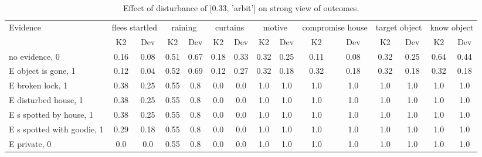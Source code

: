 \begin{table}\begin{tabular}{l|cc|cc|cc|cc|cc|cc|cc}\toprule\multirow{2}{*}{Evidence} & \multicolumn{2}{c}{flees startled}& \multicolumn{2}{c}{raining}& \multicolumn{2}{c}{curtains}& \multicolumn{2}{c}{motive}& \multicolumn{2}{c}{compromise house}& \multicolumn{2}{c}{target object}& \multicolumn{2}{c}{know object}\\& {K2} & {Dev}& {K2} & {Dev}& {K2} & {Dev}& {K2} & {Dev}& {K2} & {Dev}& {K2} & {Dev}& {K2} & {Dev}\\\midrule
no evidence, 0 & \cellcolor{Bittersweet}0.16&\cellcolor{Bittersweet}0.08&\cellcolor{Bittersweet}0.51&\cellcolor{Bittersweet}0.67&\cellcolor{Bittersweet}0.18&\cellcolor{Bittersweet}0.33&\cellcolor{Bittersweet}0.32&\cellcolor{Bittersweet}0.25&0.11&0.08&\cellcolor{Bittersweet}0.32&\cellcolor{Bittersweet}0.25&\cellcolor{Bittersweet}0.64&\cellcolor{Bittersweet}0.44\\E object is gone, 1 & \cellcolor{Bittersweet}0.12&\cellcolor{Bittersweet}0.04&\cellcolor{Bittersweet}0.52&\cellcolor{Bittersweet}0.69&\cellcolor{Bittersweet}0.12&\cellcolor{Bittersweet}0.27&\cellcolor{Bittersweet}0.32&\cellcolor{Bittersweet}0.18&\cellcolor{Bittersweet}0.32&\cellcolor{Bittersweet}0.18&\cellcolor{Bittersweet}0.32&\cellcolor{Bittersweet}0.18&\cellcolor{Bittersweet}0.32&\cellcolor{Bittersweet}0.18\\E broken lock, 1 & \cellcolor{Bittersweet}0.38&\cellcolor{Bittersweet}0.25&\cellcolor{Bittersweet}0.55&\cellcolor{Bittersweet}0.8&0.0&0.0&1.0&1.0&1.0&1.0&1.0&1.0&1.0&1.0\\E disturbed house, 1 & \cellcolor{Bittersweet}0.38&\cellcolor{Bittersweet}0.25&\cellcolor{Bittersweet}0.55&\cellcolor{Bittersweet}0.8&0.0&0.0&1.0&1.0&1.0&1.0&1.0&1.0&1.0&1.0\\E s spotted by house, 1 & \cellcolor{Bittersweet}0.38&\cellcolor{Bittersweet}0.25&\cellcolor{Bittersweet}0.55&\cellcolor{Bittersweet}0.8&0.0&0.0&1.0&1.0&1.0&1.0&1.0&1.0&1.0&1.0\\E s spotted with goodie, 1 & \cellcolor{Bittersweet}0.29&\cellcolor{Bittersweet}0.18&\cellcolor{Bittersweet}0.55&\cellcolor{Bittersweet}0.8&0.0&0.0&1.0&1.0&1.0&1.0&1.0&1.0&1.0&1.0\\E private, 0 & 0.0&0.0&\cellcolor{Bittersweet}0.55&\cellcolor{Bittersweet}0.8&0.0&0.0&1.0&1.0&1.0&1.0&1.0&1.0&1.0&1.0\\\bottomrule\end{tabular}\caption{Effect of disturbance of [0.33, 'arbit'] on strong view of outcomes.}\end{table}
